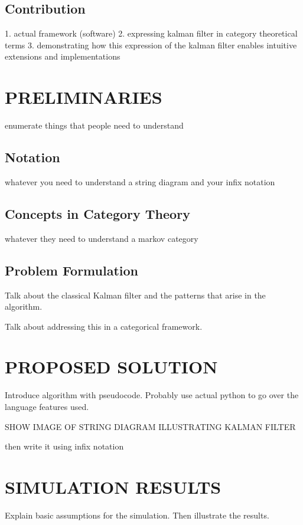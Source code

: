 \documentclass[letterpaper, 10 pt, conference]{ieeeconf}  %
\begin{document}
\subsection{Contribution}
1. actual framework (software)
2. expressing kalman filter in category theoretical terms
3. demonstrating how this expression of the kalman filter enables intuitive extensions and implementations

\section{PRELIMINARIES}

enumerate things that people need to understand
\subsection{Notation}

whatever you need to understand a string diagram and your infix notation

\subsection{Concepts in Category Theory}

whatever they need to understand a markov category

\subsection{Problem Formulation}

Talk about the classical Kalman filter and the patterns that arise in the algorithm.

Talk about addressing this in a categorical framework.

\section{PROPOSED SOLUTION}

Introduce algorithm with pseudocode.
Probably use actual python to go over the language features used.

SHOW IMAGE OF STRING DIAGRAM ILLUSTRATING KALMAN FILTER

then write it using infix notation

\section{SIMULATION RESULTS}

Explain basic assumptions for the simulation. Then illustrate the results.
\end{document}
